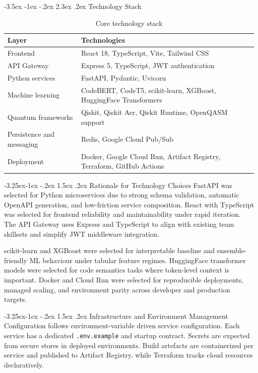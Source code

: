 \documentclass[12pt,a4paper]{report}
\makeatletter
\renewcommand\section{\@startsection{section}{1}{\z@}%
  {-3.5ex \@plus -1ex \@minus -.2ex}%
  {2.3ex \@plus.2ex}%
  {\normalfont\bfseries\fontsize{12pt}{16pt}\selectfont}}
\renewcommand\subsection{\@startsection{subsection}{2}{\z@}%
  {-3.25ex\@plus -1ex \@minus -.2ex}%
  {1.5ex \@plus .2ex}%
  {\normalfont\bfseries\fontsize{12pt}{16pt}\selectfont}}
\makeatother
\begin{document}
\section{Technology Stack}
\begin{table}[H]
\centering
\caption{Core technology stack}
\begin{tabular}{p{}p{}}
\toprule
\textbf{Layer} & \textbf{Technologies} \\
\midrule
Frontend & React 18, TypeScript, Vite, Tailwind CSS \\
API Gateway & Express 5, TypeScript, JWT authentication \\
Python services & FastAPI, Pydantic, Uvicorn \\
Machine learning & CodeBERT, CodeT5, scikit-learn, XGBoost, HuggingFace Transformers \\
Quantum frameworks & Qiskit, Qiskit Aer, Qiskit Runtime, OpenQASM support \\
Persistence and messaging & Redis, Google Cloud Pub/Sub \\
Deployment & Docker, Google Cloud Run, Artifact Registry, Terraform, GitHub Actions \\
\bottomrule
\end{tabular}
\end{table}

\subsection{Rationale for Technology Choices}
FastAPI was selected for Python microservices due to strong schema validation, automatic OpenAPI generation, and low-friction service composition. React with TypeScript was selected for frontend reliability and maintainability under rapid iteration. The API Gateway uses Express and TypeScript to align with existing team skillsets and simplify JWT middleware integration.

scikit-learn and XGBoost were selected for interpretable baseline and ensemble-friendly ML behaviour under tabular feature regimes. HuggingFace transformer models were selected for code semantics tasks where token-level context is important. Docker and Cloud Run were selected for reproducible deployments, managed scaling, and environment parity across developer and production targets.

\subsection{Infrastructure and Environment Management}
Configuration follows environment-variable driven service configuration. Each service has a dedicated \texttt{.env.example} and startup contract. Secrets are expected from secure stores in deployed environments. Build artefacts are containerized per service and published to Artifact Registry, while Terraform tracks cloud resources declaratively.
\end{document}
